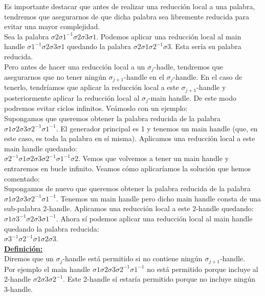 Es importante destacar que antes de realizar una reducción local a una palabra, tendremos que asegurarnos de que dicha palabra sea libremente reducida para evitar una mayor complejidad.\\

Sea la palabra $\sigma2\sigma1^{-1}\sigma2\sigma3\sigma1$. Podemos aplicar una reducción local al main handle $\sigma1^{-1}\sigma2\sigma3\sigma1$ quedando la palabra $\sigma2\sigma1\sigma2^{-1}\sigma3$. Esta sería su palabra reducida.\\

Pero antes de hacer una reducción local a un $\sigma_{j}$-hadle, tendremos que asegurarnos que no tener ningún $\sigma_{j+1}$-handle en el $\sigma_{j}$-handle. En el caso de tenerlo, tendríamos que aplicar la reducción local a este $\sigma_{j+1}$-handle y posteriormente aplicar la reducción local al $\sigma_{j}$-main handle. De este modo podremos evitar ciclos infinitos. Veámoslo con un ejemplo:\\

Supongamos que queremos obtener la palabra reducida de la palabra $\sigma1\sigma2\sigma3\sigma2^{-1}\sigma1^{-1}$. El generador principal es 1 y tenemos un main handle (que, en este caso, es toda la palabra en sí misma). Aplicamos una reducción local a este main handle quedando: \\
$\sigma2^{-1}\sigma1\sigma2\sigma3\sigma2^{-1}\sigma1^{-1}\sigma2$.
Vemos que volvemos a tener un main handle y entraremos en bucle infinito. Veamos cómo aplicaríamos la solución que hemos comentado:\\

Supongamos de nuevo que queremos obtener la palabra reducida de la palabra $\sigma1\sigma2\sigma3\sigma2^{-1}\sigma1^{-1}$. Tenemos un main handle pero dicho main handle consta de una sub-palabra 2-handle. Aplicamos una reducción local a este 2-handle quedando:\\
$\sigma1\sigma3^{-1}\sigma2\sigma3\sigma1^{-1}$. Ahora sí podemos aplicar una reducción local al main handle quedando la palabra reducida: \\
$\sigma3^{-1}\sigma2^{-1}\sigma1\sigma2\sigma3$.\\

\underline{\textbf{Definición:}} \\
Diremos que un  $\sigma_{j}$-handle está permitido si no contiene ningún $\sigma_{j+1}$-handle.\\

Por ejemplo el main handle $\sigma1\sigma2\sigma3\sigma2^{-1}\sigma1^{-1}$ no está permitido porque incluye al 2-handle $\sigma2\sigma3\sigma2^{-1}$. Este 2-handle sí estaría permitido porque no incluye ningún 3-handle. \\

